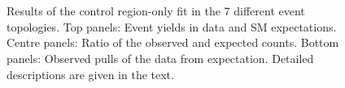 \begin{figure}[!h]
{  }\\
  ~ 
  \\
  \caption{\label{fig:cr-fit} Results of the control region-only fit in the 7 different event topologies.
  Top panels:  Event yields in data and SM expectations.
  Centre panels:  Ratio of the observed and expected counts.
  Bottom panels:  Observed pulls of the data from expectation.
  Detailed descriptions are given in the text.
	}
\end{figure}


